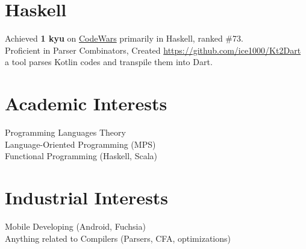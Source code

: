 \documentclass[margin, line]{res}
\begin{document}
\begin{resume}
  \section{\sc Haskell}
  Achieved
  \textbf{1 kyu} on
  \href{https://www.codewars.com/users/ice1000} {CodeWars}
  primarily in Haskell, ranked \#73. \\
  Proficient in Parser Combinators, Created
  \url{https://github.com/ice1000/Kt2Dart} \\
  a tool parses Kotlin codes and transpile them into Dart.

  \section{\sc Academic Interests}
  Programming Languages Theory \\
  Language-Oriented Programming (MPS) \\
  Functional Programming (Haskell, Scala)

  \section{\sc Industrial Interests}
  Mobile Developing (Android, Fuchsia) \\
  Anything related to Compilers (Parsers, CFA, optimizations)

  \vspace*{-.2in}
  
\end{resume}
\end{document}
